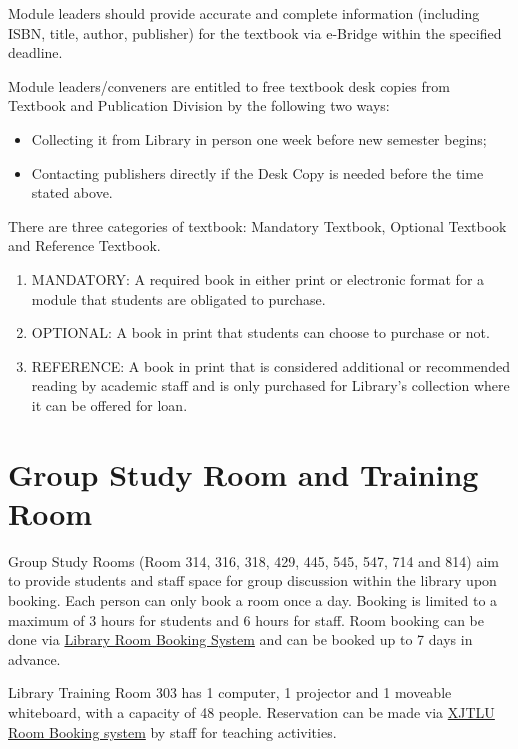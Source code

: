 \documentclass[
]{book}
\providecommand{\tightlist}{%
  \setlength{\itemsep}{0pt}\setlength{\parskip}{0pt}}
\begin{document}
Module leaders should provide accurate and complete information (including ISBN, title, author, publisher) for the textbook via e-Bridge within the specified deadline.

Module leaders/conveners are entitled to free textbook desk copies from Textbook and Publication Division by the following two ways:

\begin{itemize}
\tightlist
\item
  Collecting it from Library in person one week before new semester begins;
\item
  Contacting publishers directly if the Desk Copy is needed before the time stated above.
\end{itemize}

There are three categories of textbook: Mandatory Textbook, Optional Textbook and Reference Textbook.

\begin{enumerate}
\def\labelenumi{\arabic{enumi}.}
\tightlist
\item
  MANDATORY: A required book in either print or electronic format for a module that students are obligated to purchase.
\item
  OPTIONAL: A book in print that students can choose to purchase or not.
\item
  REFERENCE: A book in print that is considered additional or recommended reading by academic staff and is only purchased for Library's collection where it can be offered for loan.
\end{enumerate}

\hypertarget{group-study-room-and-training-room}{%
\section{Group Study Room and Training Room}\label{group-study-room-and-training-room}}

Group Study Rooms (Room 314, 316, 318, 429, 445, 545, 547, 714 and 814) aim to provide students and staff space for group discussion within the library upon booking. Each person can only book a room once a day. Booking is limited to a maximum of 3 hours for students and 6 hours for staff. Room booking can be done via \href{http://bookings.lib.xjtlu.edu.cn}{Library Room Booking System} and can be booked up to 7 days in advance.

Library Training Room 303 has 1 computer, 1 projector and 1 moveable whiteboard, with a capacity of 48 people. Reservation can be made via \href{http://mrbs.xjtlu.edu.cn/day.php}{XJTLU Room Booking system} by staff for teaching activities.
\end{document}
